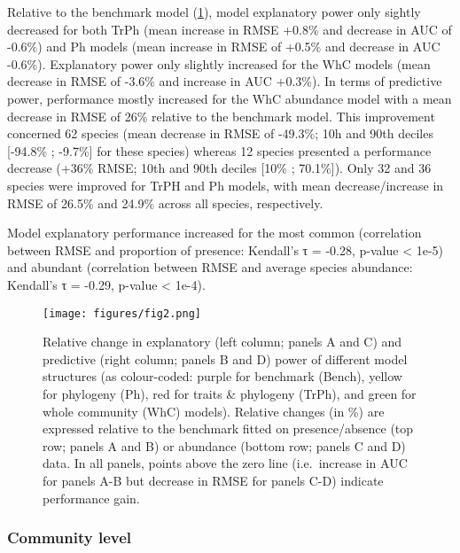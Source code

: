 \documentclass[9pt,biorxiv,doublespacing,lineno]{lapreprint}
\begin{document}
Relative to the benchmark model (\cref{fig:fig2}), model explanatory
power only sightly decreased for both TrPh (mean increase in RMSE +0.8\%
and decrease in AUC of -0.6\%) and Ph models (mean increase in RMSE of
+0.5\% and decrease in AUC -0.6\%). Explanatory power only slightly
increased for the WhC models (mean decrease in RMSE of -3.6\% and
increase in AUC +0.3\%). In terms of predictive power, performance
mostly increased for the WhC abundance model with a mean decrease in
RMSE of 26\% relative to the benchmark model. This improvement concerned
62 species (mean decrease in RMSE of -49.3\%; 10h and 90th deciles
{[}-94.8\% ; -9.7\%{]} for these species) whereas 12 species presented a
performance decrease (+36\% RMSE; 10th and 90th deciles {[}10\% ;
70.1\%{]}). Only 32 and 36 species were improved for TrPH and Ph models,
with mean decrease/increase in RMSE of 26.5\% and 24.9\% across all
species, respectively.

Model explanatory performance increased for the most common (correlation
between RMSE and proportion of presence: Kendall's τ = -0.28, p-value
\textless{} 1e-5) and abundant (correlation between RMSE and average
species abundance: Kendall's τ = -0.29, p-value \textless{} 1e-4).

\begin{figure}
\hypertarget{fig:fig2}{%
\centering
\texttt{[image: figures/fig2.png]}
\caption{Relative change in explanatory (left column; panels A and C)
and predictive (right column; panels B and D) power of different model
structures (as colour-coded: purple for benchmark (Bench), yellow for
phylogeny (Ph), red for traits \& phylogeny (TrPh), and green for whole
community (WhC) models). Relative changes (in \%) are expressed relative
to the benchmark fitted on presence/absence (top row; panels A and B) or
abundance (bottom row; panels C and D) data. In all panels, points above
the zero line (i.e.~increase in AUC for panels A-B but decrease in RMSE
for panels C-D) indicate performance gain.}\label{fig:fig2}
}
\end{figure}

\hypertarget{community-level}{%
\subsubsection{Community level}\label{community-level}}
\end{document}
